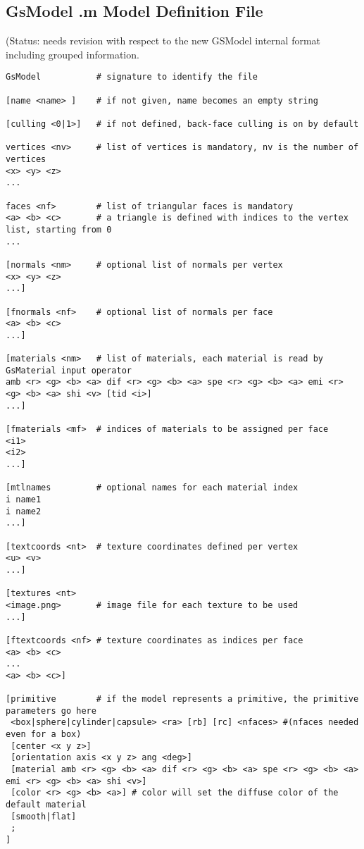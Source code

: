 \subsection{GsModel .m Model Definition File}

{\footnotesize  (Status: needs revision with respect to the new GSModel internal format including grouped information.}

\begin{lstlisting}[title={}]
GsModel           # signature to identify the file

[name <name> ]    # if not given, name becomes an empty string

[culling <0|1>]   # if not defined, back-face culling is on by default

vertices <nv>     # list of vertices is mandatory, nv is the number of vertices
<x> <y> <z>
...
  
faces <nf>        # list of triangular faces is mandatory
<a> <b> <c>       # a triangle is defined with indices to the vertex list, starting from 0
...

[normals <nm>     # optional list of normals per vertex
<x> <y> <z>
...]

[fnormals <nf>    # optional list of normals per face
<a> <b> <c> 
...]

[materials <nm>   # list of materials, each material is read by GsMaterial input operator
amb <r> <g> <b> <a> dif <r> <g> <b> <a> spe <r> <g> <b> <a> emi <r> <g> <b> <a> shi <v> [tid <i>]
...]

[fmaterials <mf>  # indices of materials to be assigned per face
<i1>
<i2>
...]

[mtlnames         # optional names for each material index
i name1
i name2
...]

[textcoords <nt>  # texture coordinates defined per vertex
<u> <v>
...]

[textures <nt>
<image.png>       # image file for each texture to be used
...]

[ftextcoords <nf> # texture coordinates as indices per face
<a> <b> <c>
...
<a> <b> <c>]

[primitive        # if the model represents a primitive, the primitive parameters go here
 <box|sphere|cylinder|capsule> <ra> [rb] [rc] <nfaces> #(nfaces needed even for a box)
 [center <x y z>]
 [orientation axis <x y z> ang <deg>]
 [material amb <r> <g> <b> <a> dif <r> <g> <b> <a> spe <r> <g> <b> <a> emi <r> <g> <b> <a> shi <v>]
 [color <r> <g> <b> <a>] # color will set the diffuse color of the default material
 [smooth|flat]
 ;
]

\end{lstlisting}